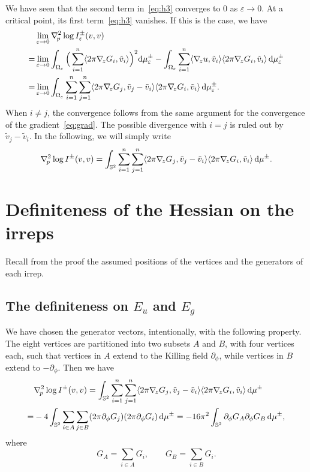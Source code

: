 \documentclass[a4paper]{amsart}
\newcommand{\uS}{\mathbb{S}}
\newcommand{\Hess}{\nabla^2}
\newcommand{\dd}{{\rm d}}
\theoremstyle{plain} %
\theoremstyle{definition} %
\theoremstyle{remark}
\begin{document}
We have seen that the second term in~\eqref{eq:h3} converges to $0$ as
$\varepsilon \to 0$.  At a critical point, its first term~\eqref{eq:h3}
vanishes.  If this is the case, we have
\begin{align*}
	&\lim_{\varepsilon \to 0} \Hess_{\! p} \log I^\pm_\varepsilon (v, v) \\
	=&\lim_{\varepsilon \to 0}
	\int_{\Omega_\varepsilon} \Big( \sum_{i=1}^n \langle 2\pi \nabla_{\! z} G_i, \tilde v_i \rangle \Big)^2 \dd\mu_\varepsilon^\pm
	- \int_{\Omega_\varepsilon} \sum_{i=1}^n \langle \nabla_{\! z} u, \tilde v_i \rangle \langle 2\pi \nabla_{\! z} G_i, \tilde v_i \rangle \, \dd \mu_\varepsilon^\pm\\
	=&\lim_{\varepsilon \to 0}
	\int_{\Omega_\varepsilon} \sum_{i=1}^n \sum_{j=1}^n \langle 2\pi \nabla_{\! z} G_j, \tilde v_j - \tilde v_i \rangle \langle 2\pi \nabla_{\! z} G_i, \tilde v_i \rangle \, \dd \mu_\varepsilon^\pm.
\end{align*}
When $i \ne j$, the convergence follows from the same argument for the
convergence of the gradient~\eqref{eq:grad}.  The possible divergence with $i
= j$ is ruled out by $\tilde v_j - \tilde v_i$.  In the following, we will
simply write
\[
	\Hess_{\! p} \log I^\pm (v, v)
	=
	\int_{\uS^2} \sum_{i=1}^n \sum_{j=1}^n \langle 2\pi \nabla_{\! z} G_j, \tilde v_j - \tilde v_i \rangle \langle 2\pi \nabla_{\! z} G_i, \tilde v_i \rangle \, \dd \mu^\pm.
\]

\section{Definiteness of the Hessian on the irreps}
\label{app:irreps}

Recall from the proof the assumed positions of the vertices and the generators
of each irrep.

\subsection{The definiteness on \texorpdfstring{$E_u$}{Eu} and \texorpdfstring{$E_g$}{Eg}}

We have chosen the generator vectors, intentionally, with the following
property.  The eight vertices are partitioned into two subsets $A$ and $B$,
with four vertices each, such that vertices in $A$ extend to the Killing field
$\partial_\phi$, while vertices in $B$ extend to $-\partial_\phi$.  Then we
have
\begin{align*}
	&\Hess_{\! p} \log I^\pm (v, v)
	=
	\int_{\uS^2} \sum_{i=1}^n \sum_{j=1}^n \langle 2\pi \nabla_{\! z} G_j, \tilde v_j - \tilde v_i \rangle \langle 2\pi \nabla_{\! z} G_i, \tilde v_i \rangle \, \dd \mu^\pm\\
	=& -4
	\int_{\uS^2} \sum_{i \in A} \sum_{j \in B} (2\pi \partial_\phi G_j)(2\pi \partial_\phi G_i) \, \dd \mu^\pm
	= -16\pi^2 \int_{\uS^2} \partial_\phi G_A \partial_\phi G_B \, \dd \mu^\pm,
\end{align*}
where
\[
	G_A = \sum_{i \in A} G_i, \qquad G_B = \sum_{i \in B} G_i.
\]
\end{document}
